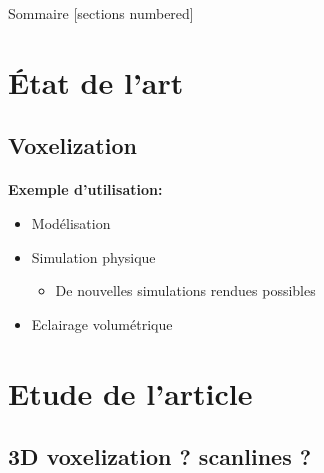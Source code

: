 \titleframe

\begin{frame}{Sommaire}
  [sections numbered]
  \tableofcontents[hideallsubsections]
\end{frame}

\section{État de l'art}

\subsection{Voxelization}

\begin{frame}[fragile=singleslide]{\insertsectionhead}
  \framesubtitle{\insertsubsectionhead}
    \textbf{Exemple d'utilisation:}
    \begin{itemize}
      \item Modélisation
      \item Simulation physique
        \begin{itemize}
          \item De nouvelles simulations rendues possibles
        \end{itemize}
      \item Eclairage volumétrique
    \end{itemize}

\end{frame}

\section{Etude de l'article}

\subsection{3D voxelization ? scanlines ?}

\begin{frame}[fragile=singleslide]{\insertsectionhead}
  \framesubtitle{\insertsubsectionhead}
\end{frame}

